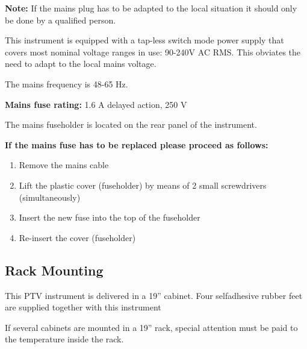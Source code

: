 \textbf{Note:}
If the mains plug has to be adapted to the local situation it should only be done by a qualified
person.

This instrument is equipped with a tap-less switch mode power supply that covers most nominal
voltage ranges in use: 90-240V AC RMS. This obviates the need to adapt to the local mains voltage.

The mains frequency is 48-65 Hz.

\begin{center}
\end{center}

\textbf{Mains fuse rating:} 1.6 A delayed action, 250 V

The mains fuseholder is located on the rear panel of the instrument.

\textbf{If the mains fuse has to be replaced please proceed as follows:}
\begin{enumerate}
\item Remove the mains cable
\item Lift the plastic cover (fuseholder) by means of 2 small screwdrivers (simultaneously)
\item Insert the new fuse into the top of the fuseholder
\item Re-insert the cover (fuseholder)
\end{enumerate}

\begin{center}
\end{center}

\subsection{Rack Mounting}
This PTV instrument is delivered in a 19'' cabinet. Four selfadhesive rubber feet are supplied together with this instrument

If several cabinets are mounted in a 19'' rack, special attention must be paid to the temperature inside the rack.


